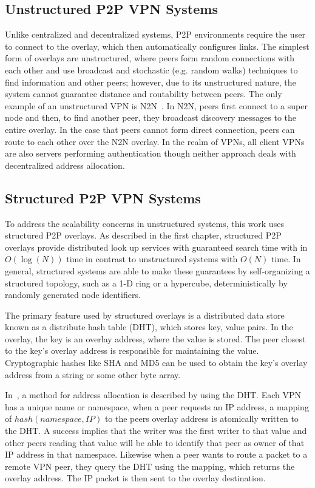 \subsection{Unstructured P2P VPN Systems} Unlike centralized and decentralized
systems, P2P environments require the user to connect to the overlay, which
then automatically configures links.  The simplest form of overlays are
unstructured, where peers form random connections with each other and use
broadcast and stochastic (e.g. random walks) techniques to find information and
other peers; however, due to its unstructured nature, the system cannot
guarantee distance and routability between peers.  The only example of an
unstructured VPN is N2N~\cite{n2n}.  In N2N, peers first connect to a super
node and then, to find another peer, they broadcast discovery messages to the
entire overlay.  In the case that peers cannot form direct connection, peers
can route to each other over the N2N overlay.  In the realm of VPNs, all client
VPNs are also servers performing authentication though neither approach deals
with decentralized address allocation.

\subsection{Structured P2P VPN Systems}

To address the scalability concerns in unstructured systems, this work uses
structured P2P overlays.  As described in the first chapter, structured P2P
overlays provide distributed look up services with guaranteed search time with
in $O(\log(N))$ time in contrast to unstructured systems with $O(N)$ time.  In
general, structured systems are able to make these guarantees by
self-organizing a structured topology, such as a 1-D ring or a hypercube,
deterministically by randomly generated node identifiers.

The primary feature used by structured overlays is a distributed data store
known as a distribute hash table (DHT), which stores key, value pairs.  In
the overlay, the key is an overlay address, where the value is stored.  The
peer closest to the key's overlay address is responsible for maintaining the
value.  Cryptographic hashes like SHA and MD5 can be used to obtain the key's
overlay address from a string or some other byte array.

In~\cite{pcgrid07, i3}, a method for address allocation is described by using
the DHT.  Each VPN has a unique name or namespace, when a peer requests an
IP address, a mapping of $hash(namespace, IP)$ to the peers overlay address
is atomically written to the DHT.  A success implies that the writer was the
first writer to that value and other peers reading that value will be able to
identify that peer as owner of that IP address in that namespace.  Likewise
when a peer wants to route a packet to a remote VPN peer, they query the DHT
using the mapping, which returns the overlay address.  The IP packet is then
sent to the overlay destination.

